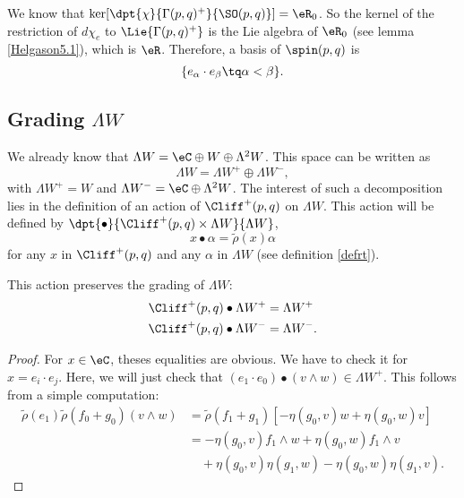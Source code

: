  We know that $\ker[\dpt{\chi}{\Gamma(p,q)^+}{\SO(p,q)}]=\eR_0$. So the kernel of the restriction of $d\chi_e$ to $\Lie{\Gamma(p,q)^+}$ is the Lie algebra of $\eR_0$ (see lemma \ref{Helgason5.1}), which is $\eR$. Therefore, a basis of $\spin(p,q)$ is 
\[
	\{e_{\alpha}\cdot e_{\beta}\tq \alpha<\beta\}.
\]

\subsection{Grading \texorpdfstring{$\Lambda W$}{LW}}

We already know that $\Lambda W=\eC\oplus W\oplus\Lambda^2W$. This space can be written as \[\Lambda W =\Lambda W^+\oplus\Lambda W^-,\] with $\Lambda W^+=W$ and $\Lambda W^-=\eC\oplus\Lambda^2W$. The interest of such a decomposition lies in the definition of an action of $\Cliff^+(p,q)$ on $\Lambda W $. This action will be defined by $\dpt{\bullet}{\Cliff^+(p,q)\times\Lambda W }{\Lambda W }$, 
  \[
 x\bullet\alpha=\tilde\rho(x)\alpha
 \]
for any $x$ in $\Cliff^+(p,q)$ and any $\alpha$ in $\Lambda W $ (see definition \ref{defrt}).

\begin{proposition}
This action preserves the grading of $\Lambda W $:
\begin{equation}
\begin{split}
 \Cliff^+(p,q)\bullet\Lambda W^+&=\Lambda W^+\\
 \Cliff^+(p,q)\bullet\Lambda W^-&=\Lambda W^-.
\end{split}
\end{equation}

\end{proposition}
\begin{proof}
For $x\in\eC$, theses equalities are obvious. We have to check it for $x=e_i\cdot e_j$. Here, we will just check that $(e_1\cdot e_0)\bullet(v\wedge w)\in\Lambda W^+$. This follows from a simple computation:
\begin{equation}
\begin{split}
\tilde\rho(e_1)\tilde\rho(f_0+g_0)(v\wedge w)&=
                         \tilde\rho(f_1+g_1)\left[-\eta(g_0,v)w+\eta(g_0,w)v\right]\\
                    &=-\eta(g_0,v)f_1\wedge w+\eta(g_0,w)f_1\wedge v\\
                    &\quad+\eta(g_0,v)\eta(g_1,w)-\eta(g_0,w)\eta(g_1,v).
\end{split}
\end{equation}
\end{proof}

